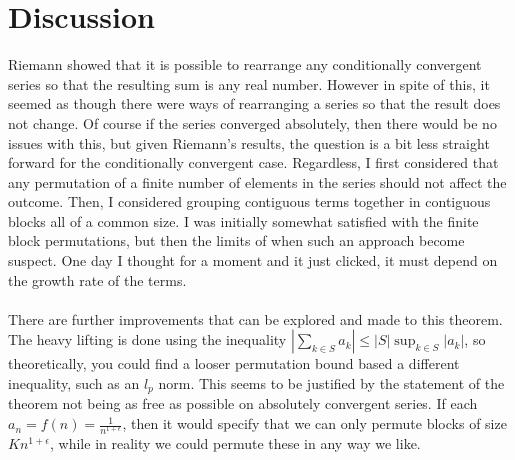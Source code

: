 \documentclass{article}
\begin{document}
	\section{Discussion}
	Riemann showed that it is possible to rearrange any conditionally convergent series so that the resulting sum is any real number. However in spite of this, it seemed as though there were ways of rearranging a series so that the result does not change. Of course if the series converged absolutely, then there would be no issues with this, but given Riemann's results, the question is a bit less straight forward for the conditionally convergent case. Regardless, I first considered that any permutation of a finite number of elements in the series should not affect the outcome. Then, I considered grouping contiguous terms together in contiguous blocks all of a common size. I was initially somewhat satisfied with the finite block permutations, but then the limits of when such an approach become suspect. One day I thought for a moment and it just clicked, it must depend on the growth rate of the terms. \\~\\
	
	There are further improvements that can be explored and made to this theorem. The heavy lifting is done using the inequality $\left| \sum_{k \in S} a_k \right| \leq \left| S \right| \sup_{k \in S} \left| a_k \right| $, so theoretically, you could find a looser permutation bound based a different inequality, such as an $l_p$ norm. This seems to be justified by the statement of the theorem not being as free as possible on absolutely convergent series. If each $a_n = f(n) = \frac{1}{n^{1 + \epsilon}}$, then it would specify that we can only permute blocks of size $ K n^{1 + \epsilon} $, while in reality we could permute these in any way we like. 
	
\end{document}
